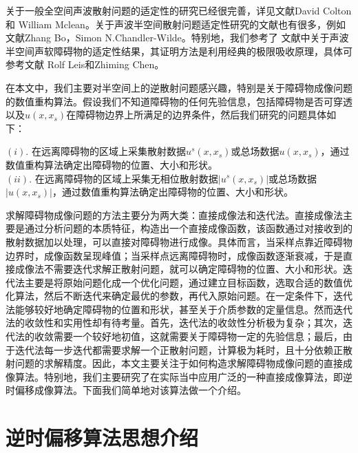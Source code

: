 关于一般全空间声波散射问题的适定性的研究已经很完善，详见文献David Colton\cite{colton-kress,Cakoni2014A}和
William Mclean\cite{Mclean2000Strongly}。关于声波半空间散射问题适定性研究的文献也有很多，例如文献Zhang Bo\cite{Bo1998Acoustic}，Simon N.Chandler-Wilde\cite{Chandler1996Scattering,Chandler1997The}。特别地，我们参考了
文献\cite{ch_ha}中关于声波半空间声软障碍物的适定性结果，其证明方法是利用经典的极限吸收原理，具体可参考文献
Rolf Leis\cite{Leis1986Initial}和Zhiming Chen\cite{cz2010,ch_cw}。


在本文中，我们主要对半空间上的逆散射问题感兴趣，特别是关于障碍物成像问题的数值重构算法。假设我们不知道障碍物的任何先验信息，包括障碍物是否可穿透以及$u(x,x_s)$在障碍物边界上所满足的边界条件，然后我们研究的问题具体如下：
 \begin{question}[半空间障碍物成像问题]\label{ques_half}
$(i).$   在远离障碍物的区域上采集散射数据$u^s(x,x_s)$或总场数据$u(x,x_s)$，通过数值重构算法确定出障碍物的位置、大小和形状。\\
$(ii).$  在远离障碍物的区域上采集无相位散射数据$|u^s(x,x_s)|$或总场数据$|u(x,x_s)|$，通过数值重构算法确定出障碍物的位置、大小和形状。
 \end{question}

 求解障碍物成像问题的方法主要分为两大类：直接成像法和迭代法。直接成像法主要是通过分析问题的本质特征，构造出一个直接成像函数，该函数通过对接收到的散射数据加以处理，可以直接对障碍物进行成像。具体而言，当采样点靠近障碍物边界时，成像函数呈现峰值；当采样点远离障碍物时，成像函数逐渐衰减，于是直接成像法不需要迭代求解正散射问题，就可以确定障碍物的位置、大小和形状。迭代法主要是将原始问题化成一个优化问题，通过建立目标函数，选取合适的数值优化算法，然后不断迭代来确定最优的参数，再代入原始问题。在一定条件下，迭代法能够较好地确定障碍物的位置和形状，甚至关于介质参数的定量信息。然而迭代法的收敛性和实用性却有待考量。首先，迭代法的收敛性分析极为复杂；其次，迭代法的收敛需要一个较好地初值，这就需要关于障碍物一定的先验信息；最后，由于迭代法每一步迭代都需要求解一个正散射问题，计算极为耗时，且十分依赖正散射问题的求解精度。因此，本文主要关注于如何构造求解障碍物成像问题的直接成像算法。特别地，我们主要研究了在实际当中应用广泛的一种直接成像算法，即逆时偏移成像算法。下面我们简单地对该算法做一个介绍。


\section{逆时偏移算法思想介绍}

